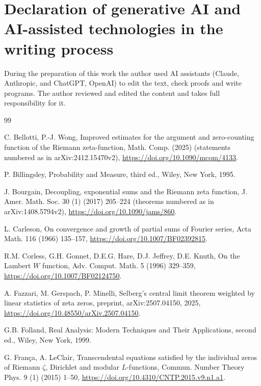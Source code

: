 \documentclass[preprint,12pt]{elsarticle}
\numberwithin{equation}{section}
\theoremstyle{plain}
\theoremstyle{definition}
\theoremstyle{remark}
\begin{document}
\section*{Declaration of generative AI and AI-assisted technologies in the writing process}
During the preparation of this work the author used AI assistants (Claude, Anthropic, and ChatGPT, OpenAI) to edit the text, check proofs and write programs. The author reviewed and edited the content and takes full responsibility for it.


\begin{thebibliography}{99}

C. Bellotti, P.-J. Wong, Improved estimates for the argument and zero-counting function of the Riemann zeta-function, Math. Comp. (2025) (statements numbered as in arXiv:2412.15470v2), \href{https://doi.org/10.1090/mcom/4133}{https://doi.org/10.1090/mcom/4133}.

P. Billingsley, Probability and Measure, third ed., Wiley, New York, 1995.

J. Bourgain, Decoupling, exponential sums and the Riemann zeta function, J. Amer. Math. Soc. 30 (1) (2017) 205--224 (theorems numbered as in arXiv:1408.5794v2), \href{https://doi.org/10.1090/jams/860}{https://doi.org/10.1090/jams/860}.

L. Carleson, On convergence and growth of partial sums of Fourier series, Acta Math. 116 (1966) 135--157, \href{https://doi.org/10.1007/BF02392815}{https://doi.org/10.1007/BF02392815}.

R.M. Corless, G.H. Gonnet, D.E.G. Hare, D.J. Jeffrey, D.E. Knuth, On the Lambert $W$ function, Adv. Comput. Math. 5 (1996) 329--359, \href{https://doi.org/10.1007/BF02124750}{https://doi.org/10.1007/BF02124750}.

A. Fazzari, M. Gerspach, P. Minelli, Selberg's central limit theorem weighted by linear statistics of zeta zeros, preprint, arXiv:2507.04150, 2025, \href{https://doi.org/10.48550/arXiv.2507.04150}{https://doi.org/10.48550/arXiv.2507.04150}.

G.B. Folland, Real Analysis: Modern Techniques and Their Applications, second ed., Wiley, New York, 1999.




G. Fran\c{c}a, A. LeClair, Transcendental equations satisfied by the individual zeros of Riemann $\zeta$, Dirichlet and modular $L$-functions, Commun. Number Theory Phys. 9 (1) (2015) 1--50, \href{https://doi.org/10.4310/CNTP.2015.v9.n1.a1}{https://doi.org/10.4310/CNTP.2015.v9.n1.a1}.


\end{thebibliography}
\end{document}
